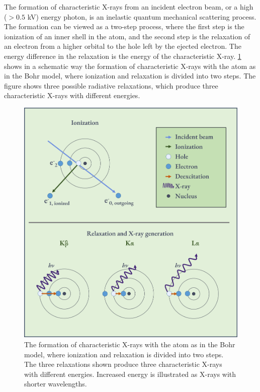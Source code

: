 The formation of characteristic X-rays from an incident electron beam, or a high ($>0.5$ kV) energy photon, is an inelastic quantum mechanical scattering process.
The formation can be viewed as a two-step process, where the first step is the ionization of an inner shell in the atom, and the second step is the relaxation of an electron from a higher orbital to the hole left by the ejected electron.
The energy difference in the relaxation is the energy of the characteristic X-ray.
\cref{fig:characteristic_xray_formation} shows in a schematic way the formation of characteristic X-rays with the atom as in the Bohr model, where ionization and relaxation is divided into two steps.
The figure shows three possible radiative relaxations, which produce three characteristic X-rays with different energies.


\begin{figure}[ht]
    \centering
    \includegraphics[width=0.7\linewidth]{figures/characteristic_xray_formation.png}
    \caption{
        The formation of characteristic X-rays with the atom as in the Bohr model, where ionization and relaxation is divided into two steps.
        The three relaxations shown produce three characteristic X-rays with different energies.
        Increased energy is illustrated as X-rays with shorter wavelengths.
    }
    \label{fig:characteristic_xray_formation}
\end{figure}


